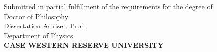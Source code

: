 
\begin{titlepage}
	\begin{center}
		\null\vfil
		{%
		\Large\bfseries%
		\begin{singlespace}
		{\expandafter\MakeUppercase\expandafter{\thetitle}}%
		\unskip\strut\par%
		\end{singlespace}
		}
		\vfill\vfill
		{%
		\large\bfseries%
		{\expandafter\MakeUppercase\expandafter{\theauthor}}%
		\unskip\strut\par%
		}
		\vfill
		\large 
		Submitted in partial fulfillment of the requirements for the degree of \\ Doctor of Philosophy\\
		\vfill
		Dissertation Adviser: Prof. {\theadvisor}\\	Department of Physics \\
		\vfill
		{\bfseries CASE WESTERN RESERVE UNIVERSITY}\\
		\vfill
		\thegraddate
		\vfil\null
	\end{center}
\end{titlepage}